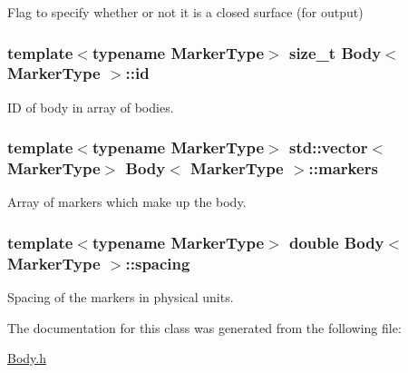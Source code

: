 Flag to specify whether or not it is a closed surface (for output) 

\subsubsection[{\texorpdfstring{id}{id}}]{\setlength{\rightskip}{0pt plus 5cm}template$<$typename Marker\+Type$>$ size\+\_\+t {\bf Body}$<$ Marker\+Type $>$\+::id\hspace{0.3cm}{\ttfamily [protected]}}\hypertarget{class_body_a9d5166d7419f303190b6c6543e67e815}{}\label{class_body_a9d5166d7419f303190b6c6543e67e815}


ID of body in array of bodies. 

\subsubsection[{\texorpdfstring{markers}{markers}}]{\setlength{\rightskip}{0pt plus 5cm}template$<$typename Marker\+Type$>$ std\+::vector$<$Marker\+Type$>$ {\bf Body}$<$ Marker\+Type $>$\+::markers\hspace{0.3cm}{\ttfamily [protected]}}\hypertarget{class_body_a4e0ac821f2331ec67793a44e36c855e3}{}\label{class_body_a4e0ac821f2331ec67793a44e36c855e3}


Array of markers which make up the body. 

\subsubsection[{\texorpdfstring{spacing}{spacing}}]{\setlength{\rightskip}{0pt plus 5cm}template$<$typename Marker\+Type$>$ double {\bf Body}$<$ Marker\+Type $>$\+::spacing\hspace{0.3cm}{\ttfamily [protected]}}\hypertarget{class_body_a1d4ac2e6fdbc946d5eab0973fd78770b}{}\label{class_body_a1d4ac2e6fdbc946d5eab0973fd78770b}


Spacing of the markers in physical units. 



The documentation for this class was generated from the following file\+:\begin{DoxyCompactItemize}
\item 
\hyperlink{_body_8h}{Body.\+h}\end{DoxyCompactItemize}
